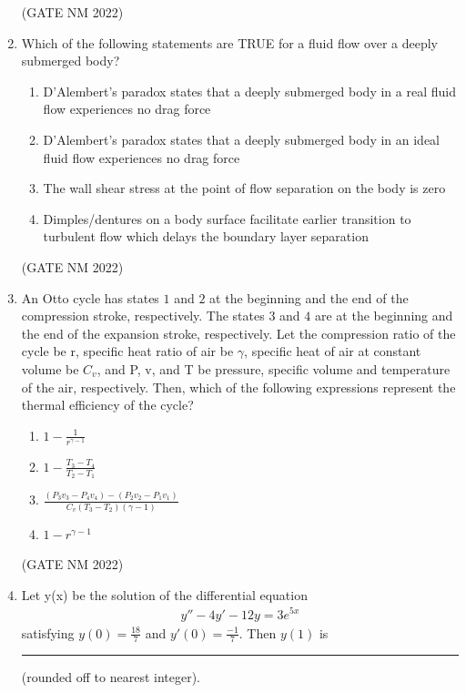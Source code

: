 \documentclass[journal,12pt,onecolumn]{IEEEtran}
\theoremstyle{remark}
\begin{document}
\begin{enumerate}
\hfill(GATE NM 2022)

\item  Which of the following statements are TRUE for a fluid flow over a deeply submerged body?
\begin{enumerate}
    \item D'Alembert's paradox states that a deeply submerged body in a real fluid flow experiences no drag force
    \item D'Alembert's paradox states that a deeply submerged body in an ideal fluid flow experiences no drag force
    \item The wall shear stress at the point of flow separation on the body is zero
    \item Dimples/dentures on a body surface facilitate earlier transition to turbulent flow which delays the boundary layer separation
\end{enumerate}

\hfill(GATE NM 2022)

\item  An Otto cycle has states $1$ and $2$ at the beginning and the end of the compression stroke, respectively.  
The states $3$ and $4$ are at the beginning and the end of the expansion stroke, respectively.  
Let the compression ratio of the cycle be r, specific heat ratio of air be $\gamma$, specific heat of air at constant volume be $C_v$, and P, v, and T be pressure, specific volume and temperature of the air, respectively.  
Then, which of the following expressions represent the thermal efficiency of the cycle?
\begin{multicols}{2}
\begin{enumerate}
    \item $1 - \frac{1}{r^{\gamma - 1}}$
    \item $1 - \frac{T_3 - T_4}{T_2 - T_1}$
    \item $\frac{(P_3 v_3 - P_4 v_4) - (P_2 v_2 - P_1 v_1)}{C_v(T_3 - T_2)(\gamma - 1)}$
    \item $1 - r^{\gamma - 1}$
\end{enumerate}
\end{multicols}

\hfill(GATE NM 2022)

\item  Let y(x) be the solution of the differential equation  
\begin{align*}
y'' - 4y' - 12y = 3e^{5x}
\end{align*}
satisfying $y(0) = {\frac{18}{7}}$ and $y'(0) = {\frac{-1}{7}}$.  
Then $y(1)$ is \rule{3cm}{0.15mm}  (rounded off to nearest integer).


\end{enumerate}
\end{document}
